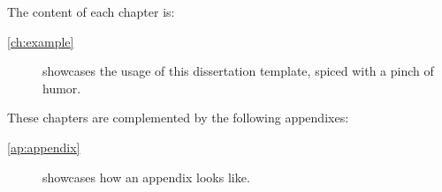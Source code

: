 The content of each chapter is:

\begin{description}
	\item[\cref{ch:example}] showcases the usage of this dissertation template, spiced with a pinch of humor.
\end{description}

These chapters are complemented by the following appendixes:

\begin{description}
	\item[\cref{ap:appendix}] showcases how an appendix looks like.
\end{description}